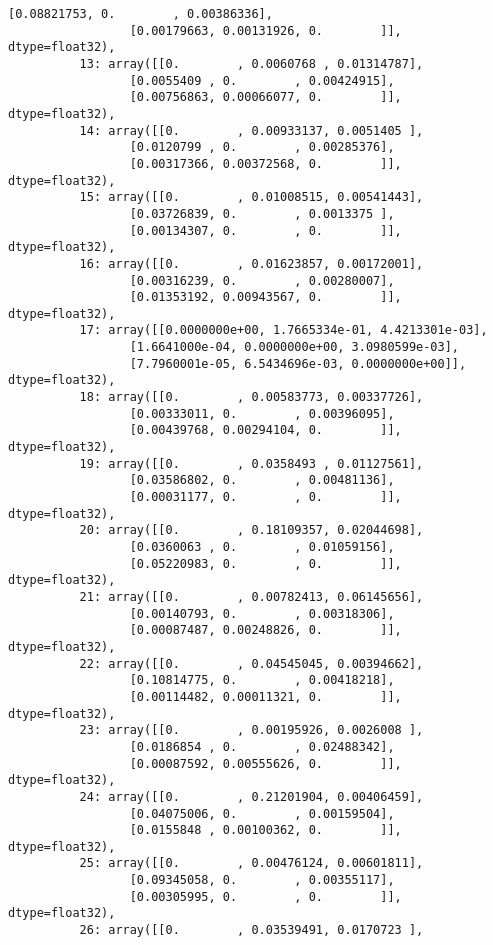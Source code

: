 \documentclass[11pt]{article}
\begin{document}
\begin{Verbatim}[commandchars=\\\{\}]
                 [0.08821753, 0.        , 0.00386336],
                 [0.00179663, 0.00131926, 0.        ]], dtype=float32),
          13: array([[0.        , 0.0060768 , 0.01314787],
                 [0.0055409 , 0.        , 0.00424915],
                 [0.00756863, 0.00066077, 0.        ]], dtype=float32),
          14: array([[0.        , 0.00933137, 0.0051405 ],
                 [0.0120799 , 0.        , 0.00285376],
                 [0.00317366, 0.00372568, 0.        ]], dtype=float32),
          15: array([[0.        , 0.01008515, 0.00541443],
                 [0.03726839, 0.        , 0.0013375 ],
                 [0.00134307, 0.        , 0.        ]], dtype=float32),
          16: array([[0.        , 0.01623857, 0.00172001],
                 [0.00316239, 0.        , 0.00280007],
                 [0.01353192, 0.00943567, 0.        ]], dtype=float32),
          17: array([[0.0000000e+00, 1.7665334e-01, 4.4213301e-03],
                 [1.6641000e-04, 0.0000000e+00, 3.0980599e-03],
                 [7.7960001e-05, 6.5434696e-03, 0.0000000e+00]], dtype=float32),
          18: array([[0.        , 0.00583773, 0.00337726],
                 [0.00333011, 0.        , 0.00396095],
                 [0.00439768, 0.00294104, 0.        ]], dtype=float32),
          19: array([[0.        , 0.0358493 , 0.01127561],
                 [0.03586802, 0.        , 0.00481136],
                 [0.00031177, 0.        , 0.        ]], dtype=float32),
          20: array([[0.        , 0.18109357, 0.02044698],
                 [0.0360063 , 0.        , 0.01059156],
                 [0.05220983, 0.        , 0.        ]], dtype=float32),
          21: array([[0.        , 0.00782413, 0.06145656],
                 [0.00140793, 0.        , 0.00318306],
                 [0.00087487, 0.00248826, 0.        ]], dtype=float32),
          22: array([[0.        , 0.04545045, 0.00394662],
                 [0.10814775, 0.        , 0.00418218],
                 [0.00114482, 0.00011321, 0.        ]], dtype=float32),
          23: array([[0.        , 0.00195926, 0.0026008 ],
                 [0.0186854 , 0.        , 0.02488342],
                 [0.00087592, 0.00555626, 0.        ]], dtype=float32),
          24: array([[0.        , 0.21201904, 0.00406459],
                 [0.04075006, 0.        , 0.00159504],
                 [0.0155848 , 0.00100362, 0.        ]], dtype=float32),
          25: array([[0.        , 0.00476124, 0.00601811],
                 [0.09345058, 0.        , 0.00355117],
                 [0.00305995, 0.        , 0.        ]], dtype=float32),
          26: array([[0.        , 0.03539491, 0.0170723 ],

\end{Verbatim}
\end{document}
